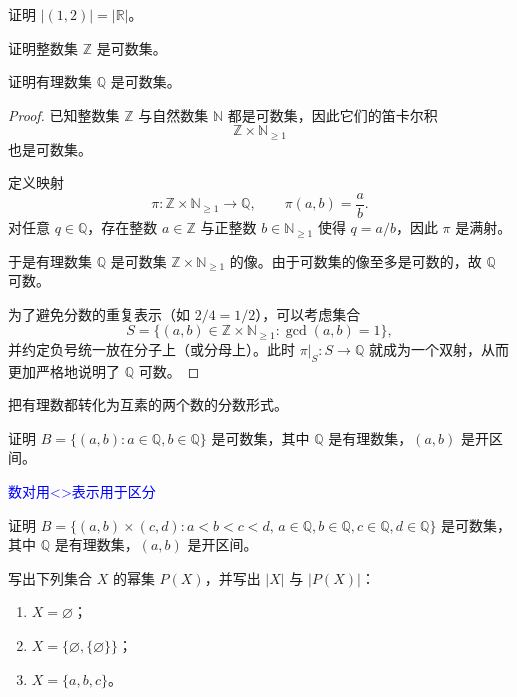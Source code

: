 \begin{homework}[1.12]
证明 $|(1,2)| = |\mathbb{R}|$。
\end{homework}

\begin{homework}[1.13]
证明整数集 $\mathbb{Z}$ 是可数集。
\end{homework}

\begin{homework}[1.14]
证明有理数集 $\mathbb{Q}$ 是可数集。
\end{homework}

\begin{proof}
已知整数集 $\mathbb{Z}$ 与自然数集 $\mathbb{N}$ 都是可数集，因此它们的笛卡尔积
\[
\mathbb{Z}\times\mathbb{N}_{\ge 1}
\]
也是可数集。

定义映射
\[
\pi:\mathbb{Z}\times\mathbb{N}_{\ge 1}\longrightarrow \mathbb{Q}, \qquad 
\pi(a,b)=\frac{a}{b}.
\]
对任意 $q\in\mathbb{Q}$，存在整数 $a\in\mathbb{Z}$ 与正整数 $b\in\mathbb{N}_{\ge1}$ 使得 $q=a/b$，因此 $\pi$ 是满射。

于是有理数集 $\mathbb{Q}$ 是可数集 $\mathbb{Z}\times\mathbb{N}_{\ge 1}$ 的像。由于可数集的像至多是可数的，故 $\mathbb{Q}$ 可数。

\medskip
为了避免分数的重复表示（如 $2/4=1/2$），可以考虑集合
\[
S=\{(a,b)\in\mathbb{Z}\times\mathbb{N}_{\ge1}:\gcd(a,b)=1\},
\]
并约定负号统一放在分子上（或分母上）。此时 $\pi|_{S}:S\to\mathbb{Q}$ 就成为一个双射，从而更加严格地说明了 $\mathbb{Q}$ 可数。
\end{proof}

\begin{dxtips}
    把有理数都转化为互素的两个数的分数形式。
\end{dxtips}

\begin{homework}[1.15]
证明 $B=\{(a,b): a\in \mathbb{Q}, b\in \mathbb{Q}\}$ 是可数集，其中 $\mathbb{Q}$ 是有理数集，$(a,b)$ 是开区间。
\end{homework}

\textcolor{blue}{数对用<>表示用于区分}

\begin{homework}[1.16]
证明 $B=\{(a,b)\times (c,d): a<b<c<d,\, a\in \mathbb{Q}, b\in \mathbb{Q}, c\in \mathbb{Q}, d\in \mathbb{Q}\}$ 是可数集，其中 $\mathbb{Q}$ 是有理数集，$(a,b)$ 是开区间。
\end{homework}

\begin{homework}[1.17]
写出下列集合 $X$ 的幂集 $P(X)$，并写出 $|X|$ 与 $|P(X)|$：
\begin{enumerate}[(1)]
  \item $X = \varnothing$；
  \item $X = \{\varnothing, \{\varnothing\}\}$；
  \item $X = \{a,b,c\}$。
\end{enumerate}
\end{homework}

